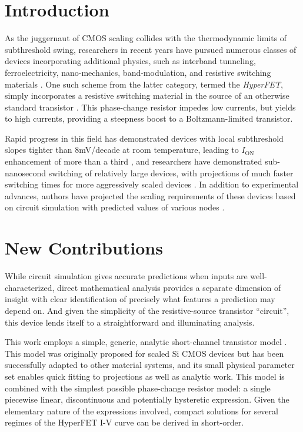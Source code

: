 \ifdoublecol\begin{multicols}{2}\fi

\section*{Introduction}
As the juggernaut of CMOS scaling collides with the thermodynamic limits of subthreshold swing, researchers in recent years have pursued numerous classes of devices incorporating additional physics, such as interband tunneling, ferroelectricity, nano-mechanics, band-modulation, and resistive switching materials \cite{Cristoloveanu_2016}.  One such scheme from the latter category, termed the \textit{HyperFET}, simply incorporates a resistive switching material in the source of an otherwise standard transistor \cite{Shukla_2015}.  This phase-change resistor impedes low currents, but yields to high currents, providing a steepness boost to a Boltzmann-limited transistor.

Rapid progress in this field has demonstrated devices with local subthreshold slopes tighter than 8mV/decade at room temperature, leading to $I_\mathrm{ON}$ enhancement of more than a third \cite{Frougier_2016}, and researchers have demonstrated sub-nanosecond switching \cite{Frougier_2016,Jerry_2016} of relatively large devices, with projections of much faster switching times for more aggressively scaled devices \cite{Jerry_2016}.  In addition to experimental advances, authors have projected the scaling requirements of these devices based on circuit simulation with predicted values of various nodes \cite{Shukla_2015,Frougier_2016}. 

\section*{New Contributions}
While circuit simulation gives accurate predictions when inputs are well-characterized, direct mathematical analysis provides a separate dimension of insight with clear identification of precisely what features a prediction may depend on. And given the simplicity of the resistive-source transistor ``circuit'', this device lends itself to a straightforward and illuminating analysis.

This work employs a simple, generic, analytic short-channel transistor model \cite{Khakifirooz_2009}.  This model was originally proposed for scaled Si CMOS devices but has been successfully adapted to other material systems, and its small physical parameter set enables quick fitting to projections as well as analytic work.  This model is combined with the simplest possible phase-change resistor model: a single piecewise linear, discontinuous and potentially hysteretic expression.  Given the elementary nature of the expressions involved, compact solutions for several regimes of the HyperFET I-V curve can be derived in short-order.


\end{multicols}
